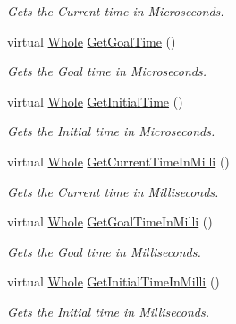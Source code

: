 \begin{DoxyCompactItemize}
\begin{DoxyCompactList}\small\item\em Gets the Current time in Microseconds. \item\end{DoxyCompactList}\item 
virtual \hyperlink{namespacephys_a460f6bc24c8dd347b05e0366ae34f34a}{Whole} \hyperlink{classphys_1_1SimpleTimer_a37b29b36164f5538988df955fd46e89b}{GetGoalTime} ()
\begin{DoxyCompactList}\small\item\em Gets the Goal time in Microseconds. \item\end{DoxyCompactList}\item 
virtual \hyperlink{namespacephys_a460f6bc24c8dd347b05e0366ae34f34a}{Whole} \hyperlink{classphys_1_1SimpleTimer_a6d56952c8b2f2e3405a1bc2cc3b8a833}{GetInitialTime} ()
\begin{DoxyCompactList}\small\item\em Gets the Initial time in Microseconds. \item\end{DoxyCompactList}\item 
virtual \hyperlink{namespacephys_a460f6bc24c8dd347b05e0366ae34f34a}{Whole} \hyperlink{classphys_1_1SimpleTimer_a334e151fd080489c1704abd3039b1843}{GetCurrentTimeInMilli} ()
\begin{DoxyCompactList}\small\item\em Gets the Current time in Milliseconds. \item\end{DoxyCompactList}\item 
virtual \hyperlink{namespacephys_a460f6bc24c8dd347b05e0366ae34f34a}{Whole} \hyperlink{classphys_1_1SimpleTimer_a69b08da65148ea36b62d9d0f672e8325}{GetGoalTimeInMilli} ()
\begin{DoxyCompactList}\small\item\em Gets the Goal time in Milliseconds. \item\end{DoxyCompactList}\item 
virtual \hyperlink{namespacephys_a460f6bc24c8dd347b05e0366ae34f34a}{Whole} \hyperlink{classphys_1_1SimpleTimer_a6ff614afe79f0426c371f67dfe3016fc}{GetInitialTimeInMilli} ()
\begin{DoxyCompactList}\small\item\em Gets the Initial time in Milliseconds. \item\end{DoxyCompactList}\end{DoxyCompactItemize}
